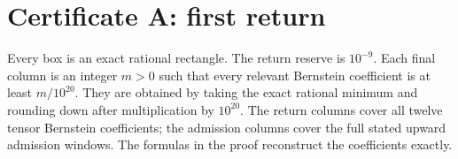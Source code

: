 \hypertarget{certificates:certificate-a-first-return}{%
\section{Certificate A: first return}\label{certificates:certificate-a-first-return}}

Every box is an exact rational rectangle. The return reserve is \(10^{-9}\). Each final column is an integer \(m>0\) such that every relevant Bernstein coefficient is at least \(m/10^{20}\). They are obtained by taking the exact rational minimum and rounding down after multiplication by \(10^{20}\). The return columns cover all twelve tensor Bernstein coefficients; the admission columns cover the full stated upward admission windows. The formulas in the proof reconstruct the coefficients exactly.

